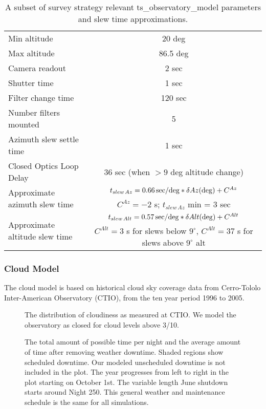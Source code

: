 \begin{table}[b]
\begin{centering}
\begin{tabular}{lc}
\toprule
Min altitude  & 20 deg \\
Max altitude & 86.5 deg \\
Camera readout & 2 sec\\
Shutter time & 1 sec \\
Filter change time & 120 sec \\
Number filters mounted & 5 \\
Azimuth slew settle time & 1 sec \\
Closed Optics Loop Delay & 36 sec (when $>9$ deg altitude change) \\
\multirow{2}{*}{Approximate azimuth slew time} &   $ t_{slew \, Az} = 0.66 \, {\rm sec/deg} * \delta Az ({\rm deg}) + C^{Az} $  \\
   &   $C^{Az} = -2$ s;   $t_{slew \, Az}$  min = 3 sec \\
\multirow{2}{*}{Approximate altitude slew time}  &  $  t_{slew \, Alt} = 0.57 \, {\rm sec/deg} * \delta Alt ({\rm deg}) + C^{Alt} $ \\
   & $C^{Alt} = 3$ s for slews below $9^\circ$, $C^{Alt} = 37$ s for slews above $9^\circ$ alt \\
\hline
\end{tabular}
\caption{A subset of survey strategy relevant ts\_observatory\_model parameters and slew time approximations.}
\label{tab:tsModel}
\end{centering}
\end{table}

\subsubsection{Cloud Model}

The cloud model is based on historical cloud sky coverage data from Cerro-Tololo Inter-American Observatory (CTIO), from the ten year period 1996 to 2005. 

\begin{figure}
\caption{The distribution of cloudiness as measured at CTIO. We model the observatory as closed for cloud levels above 3/10.}
\end{figure}

\begin{figure}
\caption{The total amount of possible time per night and the average amount of time after removing weather downtime. Shaded regions show scheduled downtime. Our modeled unscheduled downtime is not included in the plot. The year progresses from left to right in the plot starting on October 1st. The variable length June shutdown starts around Night 250. This general weather and maintenance schedule is the same for all simulations.}
\end{figure}

